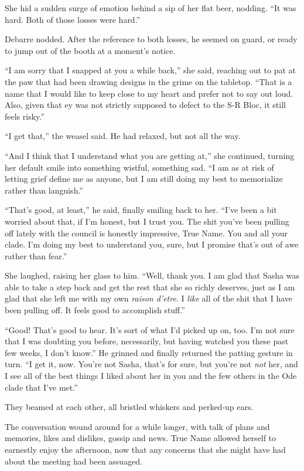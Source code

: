 She hid a sudden surge of emotion behind a sip of her flat beer, nodding. ``It was hard. Both of those losses were hard.''

Debarre nodded. After the reference to both losses, he seemed on guard, or ready to jump out of the booth at a moment's notice.

``I am sorry that I snapped at you a while back,'' she said, reaching out to pat at the paw that had been drawing designs in the grime on the tabletop. ``That is a name that I would like to keep close to my heart and prefer not to say out loud. Also, given that ey was not strictly supposed to defect to the S-R Bloc, it still feels risky.''

``I get that,'' the weasel said. He had relaxed, but not all the way.

``And I think that I understand what you are getting at,'' she continued, turning her default smile into something wistful, something sad. ``I am as at risk of letting grief define me as anyone, but I am still doing my best to memorialize rather than languish.''

``That's good, at least,'' he said, finally smiling back to her. ``I've been a bit worried about that, if I'm honest, but I trust you. The shit you've been pulling off lately with the council is honestly impressive, True Name. You and all your clade. I'm doing my best to understand you, sure, but I promise that's out of awe rather than fear.''

She laughed, raising her glass to him. ``Well, thank you. I am glad that Sasha was able to take a step back and get the rest that she so richly deserves, just as I am glad that she left me with my own \emph{raison d'etre}. I \emph{like} all of the shit that I have been pulling off. It feels good to accomplish stuff.''

``Good! That's good to hear. It's sort of what I'd picked up on, too. I'm not sure that I was doubting you before, necessarily, but having watched you these past few weeks, I don't know.'' He grinned and finally returned the patting gesture in turn. ``I get it, now. You're not Sasha, that's for sure, but you're not \emph{not} her, and I see all of the best things I liked about her in you and the few others in the Ode clade that I've met.''

They beamed at each other, all bristled whiskers and perked-up ears.

The conversation wound around for a while longer, with talk of plans and memories, likes and dislikes, gossip and news. True Name allowed herself to earnestly enjoy the afternoon, now that any concerns that she might have had about the meeting had been assuaged.

